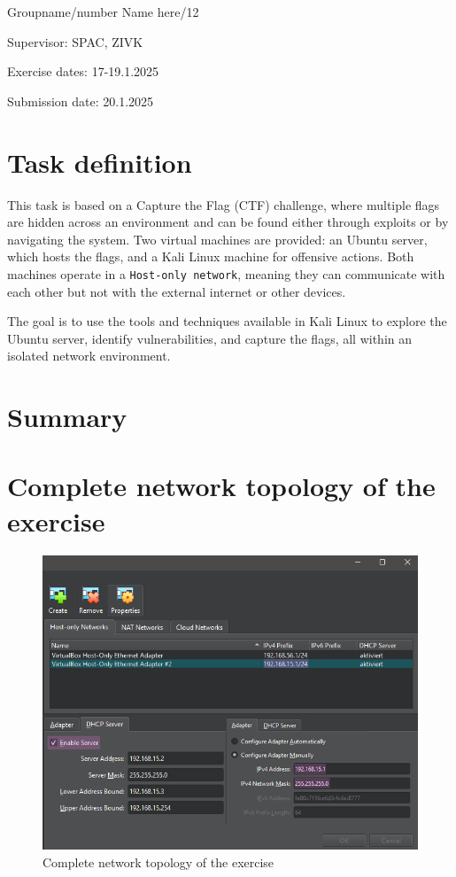 \documentclass[a4paper]{article}
\newcommand{\abc}{\hfill \break}
\begin{document}
Groupname/number Name here/12

Supervisor: 	SPAC, ZIVK

Exercise dates: 17-19.1.2025

Submission date: 20.1.2025


\newpage
\tableofcontents

\newpage

\section{Task definition}

This task is based on a Capture the Flag (CTF) challenge, where multiple flags are hidden across an environment and can be found either through exploits or by navigating the system. Two virtual machines are provided: an Ubuntu server, which hosts the flags, and a Kali Linux machine for offensive actions. Both machines operate in a \texttt{Host-only network}, meaning they can communicate with each other but not with the external internet or other devices.

The goal is to use the tools and techniques available in Kali Linux to explore the Ubuntu server, identify vulnerabilities, and capture the flags, all within an isolated network environment.


\section{Summary}

\newpage

\section{Complete network topology of the exercise}
\begin{figure}[h]
	\includegraphics[scale=0.4]{./images/nwipsfr.png}
	\centering
	\caption{Complete network topology of the exercise}
\end{figure}\abc
\end{document}
